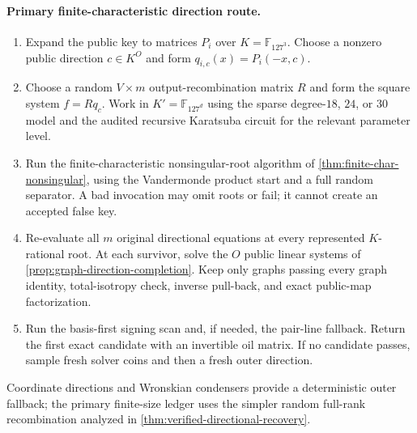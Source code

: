 \documentclass[11pt,a4paper]{article}
\theoremstyle{definition}
\theoremstyle{remark}
\newcommand{\F}{\mathbb F}
\begin{document}
\paragraph{Primary finite-characteristic direction route.}
\begin{enumerate}
\item Expand the public key to matrices $P_i$ over $K=\F_{127^3}$.  Choose a nonzero public direction $c\in K^O$ and form $q_{i,c}(x)=P_i(-x,c)$.
\item Choose a random $V\times m$ output-recombination matrix $R$ and form the square system $f=Rq_c$.  Work in $K'=\F_{127^d}$ using the sparse degree-$18$, $24$, or $30$ model and the audited recursive Karatsuba circuit for the relevant parameter level.
\item Run the finite-characteristic nonsingular-root algorithm of \cref{thm:finite-char-nonsingular}, using the Vandermonde product start and a full random separator.  A bad invocation may omit roots or fail; it cannot create an accepted false key.
\item Re-evaluate all $m$ original directional equations at every represented $K$-rational root.  At each survivor, solve the $O$ public linear systems of \cref{prop:graph-direction-completion}.  Keep only graphs passing every graph identity, total-isotropy check, inverse pull-back, and exact public-map factorization.
\item Run the basis-first signing scan and, if needed, the pair-line fallback.  Return the first exact candidate with an invertible oil matrix.  If no candidate passes, sample fresh solver coins and then a fresh outer direction.
\end{enumerate}
Coordinate directions and Wronskian condensers provide a deterministic outer fallback; the primary finite-size ledger uses the simpler random full-rank recombination analyzed in \cref{thm:verified-directional-recovery}.
\end{document}
